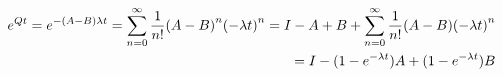 \documentclass[10pt]{article}
\begin{document}
\begin{eqnarray*}
  &&e^{Qt}=e^{-\qty(A-B)\lambda t}=\sum_{n=0}^\infty\frac{1}{n!}\qty(A-B)^n\qty(-\lambda t)^n=I-A+B+\sum_{n=0}^\infty\frac{1}{n!}\qty(A-B)\qty(-\lambda t)^n\\
  &&=I-(1-e^{-\lambda t})A + (1-e^{-\lambda t})B
\end{eqnarray*}




\end{document}
